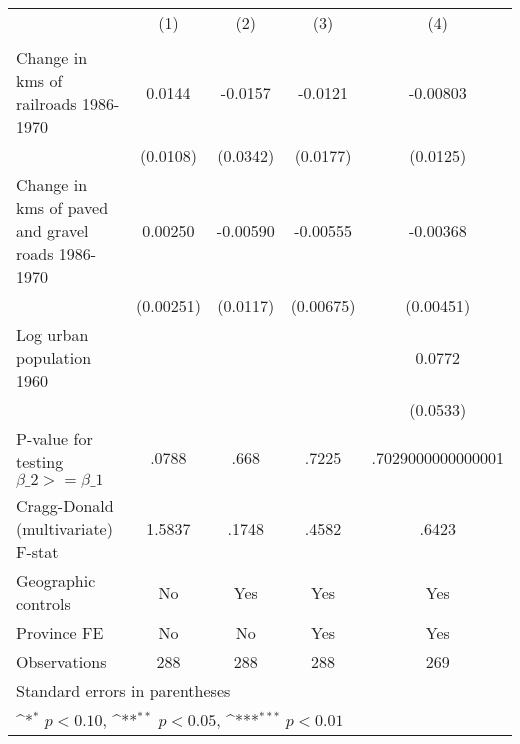 {
\def\sym#1{\ifmmode^{#1}\else\(^{#1}\)\fi}
\begin{tabular}{l*{4}{c}}
\hline\hline
                &\multicolumn{1}{c}{(1)}&\multicolumn{1}{c}{(2)}&\multicolumn{1}{c}{(3)}&\multicolumn{1}{c}{(4)}\\
                &\multicolumn{1}{c}{}&\multicolumn{1}{c}{}&\multicolumn{1}{c}{}&\multicolumn{1}{c}{}\\
\hline
Change in kms of railroads 1986-1970&   0.0144         &  -0.0157         &  -0.0121         & -0.00803         \\
                & (0.0108)         & (0.0342)         & (0.0177)         & (0.0125)         \\
[1em]
Change in kms of paved and gravel roads 1986-1970&  0.00250         & -0.00590         & -0.00555         & -0.00368         \\
                &(0.00251)         & (0.0117)         &(0.00675)         &(0.00451)         \\
[1em]
Log urban population 1960&                  &                  &                  &   0.0772         \\
                &                  &                  &                  & (0.0533)         \\
\hline
P-value for testing $\beta\_{2} >= \beta\_{1}$&    .0788         &     .668         &    .7225         &.7029000000000001         \\
Cragg-Donald (multivariate) F-stat&   1.5837         &    .1748         &    .4582         &    .6423         \\
Geographic controls&       No         &      Yes         &      Yes         &      Yes         \\
Province FE     &       No         &       No         &      Yes         &      Yes         \\
Observations    &      288         &      288         &      288         &      269         \\
\hline\hline
\multicolumn{5}{l}{\footnotesize Standard errors in parentheses}\\
\multicolumn{5}{l}{\footnotesize \sym{*} \(p<0.10\), \sym{**} \(p<0.05\), \sym{***} \(p<0.01\)}\\
\end{tabular}
}
